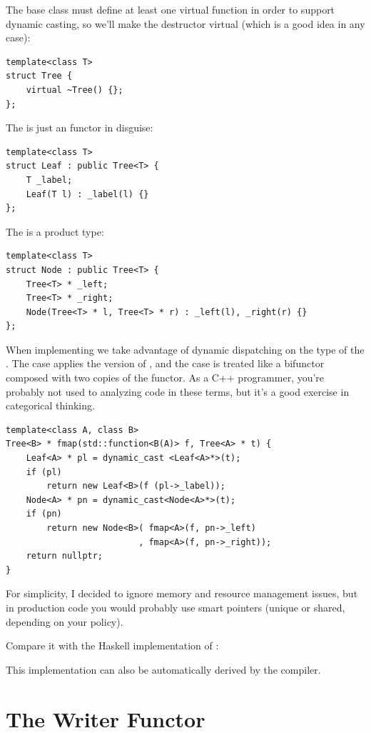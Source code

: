 The base class must define at least one virtual function in order to
support dynamic casting, so we'll make the destructor virtual (which is
a good idea in any case):

\begin{Verbatim}
template<class T>
struct Tree { 
    virtual ~Tree() {};
};
\end{Verbatim}
The  is just an  functor in disguise:

\begin{Verbatim}
template<class T>
struct Leaf : public Tree<T> {
    T _label;
    Leaf(T l) : _label(l) {}
};
\end{Verbatim}
The  is a product type:

\begin{Verbatim}
template<class T>
struct Node : public Tree<T> {
    Tree<T> * _left;
    Tree<T> * _right;
    Node(Tree<T> * l, Tree<T> * r) : _left(l), _right(r) {}
};
\end{Verbatim}
When implementing  we take advantage of dynamic dispatching
on the type of the . The  case applies the
 version of , and the  case
is treated like a bifunctor composed with two copies of the
 functor. As a C++ programmer, you're probably not used to
analyzing code in these terms, but it's a good exercise in categorical
thinking.

\begin{Verbatim}
template<class A, class B>
Tree<B> * fmap(std::function<B(A)> f, Tree<A> * t) {
    Leaf<A> * pl = dynamic_cast <Leaf<A>*>(t);
    if (pl)
        return new Leaf<B>(f (pl->_label));
    Node<A> * pn = dynamic_cast<Node<A>*>(t);
    if (pn)
        return new Node<B>( fmap<A>(f, pn->_left) 
                          , fmap<A>(f, pn->_right));
    return nullptr;
}
\end{Verbatim}
For simplicity, I decided to ignore memory and resource management
issues, but in production code you would probably use smart pointers
(unique or shared, depending on your policy).

Compare it with the Haskell implementation of :

This implementation can also be automatically derived by the compiler.

\section{The Writer Functor}


